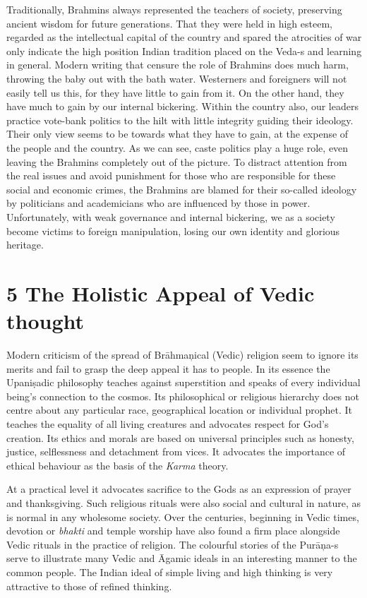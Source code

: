 Traditionally, Brahmins always represented the teachers of society, preserving ancient wisdom for future generations. That they were held in high esteem, regarded as the intellectual capital of the country and spared the atrocities of war only indicate the high position Indian tradition placed on the Veda-s and learning in general. Modern writing that censure the role of Brahmins does much harm, throwing the baby out with the bath water. Westerners and foreigners will not easily tell us this, for they have little to gain from it. On the other hand, they have much to gain by our internal bickering. Within the country also, our leaders practice vote-bank politics to the hilt with little integrity guiding their ideology. Their only view seems to be towards what they have to gain, at the expense of the people and the country. As we can see, caste politics play a huge role, even leaving the Brahmins completely out of the picture. To distract attention from the real issues and avoid punishment for those who are responsible for these social and economic crimes, the Brahmins are blamed for their so-called ideology by politicians and academicians who are influenced by those in power. Unfortunately, with weak governance and internal bickering, we as a society become victims to foreign manipulation, losing our own identity and glorious heritage.


\section*{5 The Holistic Appeal of Vedic thought}

Modern criticism of the spread of Brāhmaņical (Vedic) religion seem to ignore its merits and fail to grasp the deep appeal it has to people. In its essence the Upaniṣadic philosophy teaches against superstition and speaks of every individual being’s connection to the cosmos. Its philosophical or religious hierarchy does not centre about any particular race, geographical location or individual prophet. It teaches the equality of all living creatures and advocates respect for God’s creation. Its ethics and morals are based on universal principles such as honesty, justice, selflessness and detachment from vices. It advocates the importance of ethical behaviour as the basis of the \textit{Karma} theory.

At a practical level it advocates sacrifice to the Gods as an expression of prayer and thanksgiving. Such religious rituals were also social and cultural in nature, as is normal in any wholesome society. Over the centuries, beginning in Vedic times, devotion or \textit{bhakti} and temple worship have also found a firm place alongside Vedic rituals in the practice of religion. The colourful stories of the Purāņa-s serve to illustrate many Vedic and Āgamic ideals in an interesting manner to the common people. The Indian ideal of simple living and high thinking is very attractive to those of refined thinking. 

